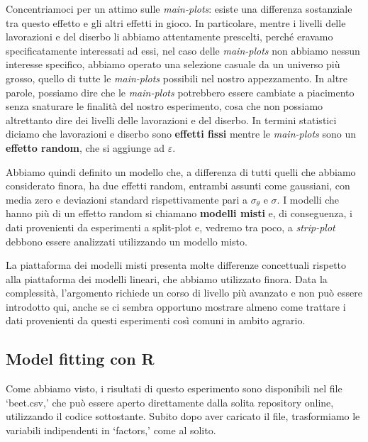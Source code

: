 \documentclass[a4paper,12pt,oneside]{book}
\begin{document}
Concentriamoci per un attimo sulle \emph{main-plots}: esiste una differenza sostanziale tra questo effetto e gli altri effetti in gioco. In particolare, mentre i livelli delle lavorazioni e del diserbo li abbiamo attentamente prescelti, perché eravamo specificatamente interessati ad essi, nel caso delle \emph{main-plots} non abbiamo nessun interesse specifico, abbiamo operato una selezione casuale da un universo più grosso, quello di tutte le \emph{main-plots} possibili nel nostro appezzamento. In altre parole, possiamo dire che le \emph{main-plots} potrebbero essere cambiate a piacimento senza snaturare le finalità del nostro esperimento, cosa che non possiamo altrettanto dire dei livelli delle lavorazioni e del diserbo. In termini statistici diciamo che lavorazioni e diserbo sono \textbf{effetti fissi} mentre le \emph{main-plots} sono un \textbf{effetto random}, che si aggiunge ad \(\varepsilon\).

Abbiamo quindi definito un modello che, a differenza di tutti quelli che abbiamo considerato finora, ha due effetti random, entrambi assunti come gaussiani, con media zero e deviazioni standard rispettivamente pari a \(\sigma_{\theta}\) e \(\sigma\). I modelli che hanno più di un effetto random si chiamano \textbf{modelli misti} e, di conseguenza, i dati provenienti da esperimenti a split-plot e, vedremo tra poco, a \emph{strip-plot} debbono essere analizzati utilizzando un modello misto.

La piattaforma dei modelli misti presenta molte differenze concettuali rispetto alla piattaforma dei modelli lineari, che abbiamo utilizzato finora. Data la complessità, l'argomento richiede un corso di livello più avanzato e non può essere introdotto qui, anche se ci sembra opportuno mostrare almeno come trattare i dati provenienti da questi esperimenti così comuni in ambito agrario.

\hypertarget{model-fitting-con-r}{%
\subsection{Model fitting con R}\label{model-fitting-con-r}}

Come abbiamo visto, i risultati di questo esperimento sono disponibili nel file `beet.csv,' che può essere aperto direttamente dalla solita repository online, utilizzando il codice sottostante. Subito dopo aver caricato il file, trasformiamo le variabili indipendenti in `factors,' come al solito.
\end{document}
